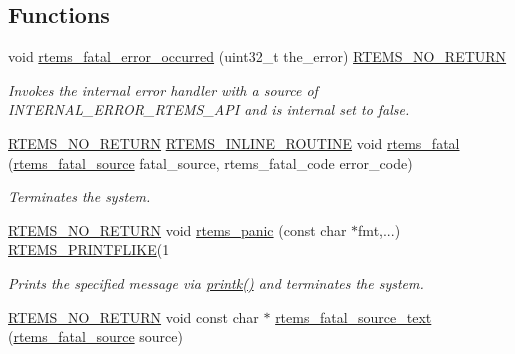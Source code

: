 \subsection*{Functions}
\begin{DoxyCompactItemize}
\item 
void \mbox{\hyperlink{group__ClassicFatal_gacadb95082c08823f56d908c248657b45}{rtems\+\_\+fatal\+\_\+error\+\_\+occurred}} (uint32\+\_\+t the\+\_\+error) \mbox{\hyperlink{group__RTEMSScoreBaseDefs_gaa2f0ed67aa174f684bb31b7e8bdb386f}{R\+T\+E\+M\+S\+\_\+\+N\+O\+\_\+\+R\+E\+T\+U\+RN}}
\begin{DoxyCompactList}\small\item\em Invokes the internal error handler with a source of I\+N\+T\+E\+R\+N\+A\+L\+\_\+\+E\+R\+R\+O\+R\+\_\+\+R\+T\+E\+M\+S\+\_\+\+A\+PI and is internal set to false. \end{DoxyCompactList}\item 
\mbox{\hyperlink{group__RTEMSScoreBaseDefs_gaa2f0ed67aa174f684bb31b7e8bdb386f}{R\+T\+E\+M\+S\+\_\+\+N\+O\+\_\+\+R\+E\+T\+U\+RN}} \mbox{\hyperlink{group__RTEMSScoreBaseDefs_gac216239df231d5dbd15e3520b0b9313f}{R\+T\+E\+M\+S\+\_\+\+I\+N\+L\+I\+N\+E\+\_\+\+R\+O\+U\+T\+I\+NE}} void \mbox{\hyperlink{group__ClassicFatal_ga53fa9338246642e0d931f61314c6609e}{rtems\+\_\+fatal}} (\mbox{\hyperlink{group__RTEMSScoreIntErr_ga878b4de77df7d0b83d19609d4de42c26}{rtems\+\_\+fatal\+\_\+source}} fatal\+\_\+source, rtems\+\_\+fatal\+\_\+code error\+\_\+code)
\begin{DoxyCompactList}\small\item\em Terminates the system. \end{DoxyCompactList}\item 
\mbox{\hyperlink{group__RTEMSScoreBaseDefs_gaa2f0ed67aa174f684bb31b7e8bdb386f}{R\+T\+E\+M\+S\+\_\+\+N\+O\+\_\+\+R\+E\+T\+U\+RN}} void \mbox{\hyperlink{group__ClassicFatal_ga9154b179577ea07395f1d637f334cfdc}{rtems\+\_\+panic}} (const char $\ast$fmt,...) \mbox{\hyperlink{group__RTEMSScoreBaseDefs_gac1811143c580ed4898c9eae63d5c5b8e}{R\+T\+E\+M\+S\+\_\+\+P\+R\+I\+N\+T\+F\+L\+I\+KE}}(1
\begin{DoxyCompactList}\small\item\em Prints the specified message via \mbox{\hyperlink{bspIo_8h_a380cfecc8035cec8a13b68c0cb90f32f}{printk()}} and terminates the system. \end{DoxyCompactList}\item 
\mbox{\hyperlink{group__RTEMSScoreBaseDefs_gaa2f0ed67aa174f684bb31b7e8bdb386f}{R\+T\+E\+M\+S\+\_\+\+N\+O\+\_\+\+R\+E\+T\+U\+RN}} void const char $\ast$ \mbox{\hyperlink{group__ClassicFatal_ga64fab8597e14215a31fa5ff98d3c1897}{rtems\+\_\+fatal\+\_\+source\+\_\+text}} (\mbox{\hyperlink{group__RTEMSScoreIntErr_ga878b4de77df7d0b83d19609d4de42c26}{rtems\+\_\+fatal\+\_\+source}} source)

\end{DoxyCompactItemize}
